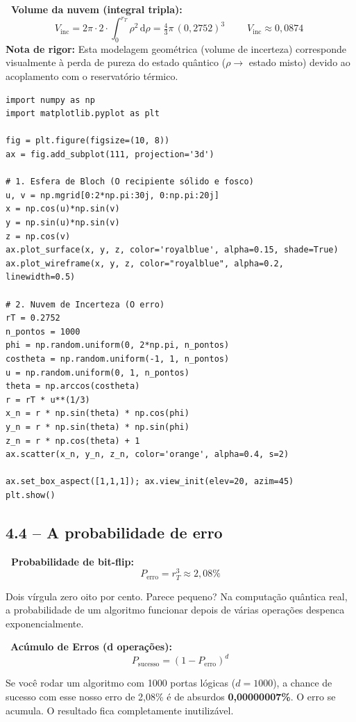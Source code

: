 \begin{mathblock}
\textbf{\color{corMath}\faSuperscript\ Volume da nuvem (integral tripla):}
\[
  V_{\text{inc}}
  = 2\pi \cdot 2 \cdot \int_0^{r_T}\rho^2\,\mathrm{d}\rho
  = \tfrac{4}{3}\pi\,(0{,}2752)^3
  \qquad
  \boxed{\;V_{\text{inc}} \approx 0{,}0874\;}
\]
{\small \textbf{Nota de rigor:} Esta modelagem geométrica (volume de incerteza) 
corresponde visualmente à perda de pureza do estado quântico ($\rho \to$ estado misto) 
devido ao acoplamento com o reservatório térmico.}
\end{mathblock}

\begin{lstlisting}[caption={Código para visualização 3D}]
import numpy as np
import matplotlib.pyplot as plt

fig = plt.figure(figsize=(10, 8))
ax = fig.add_subplot(111, projection='3d')

# 1. Esfera de Bloch (O recipiente sólido e fosco)
u, v = np.mgrid[0:2*np.pi:30j, 0:np.pi:20j]
x = np.cos(u)*np.sin(v)
y = np.sin(u)*np.sin(v)
z = np.cos(v)
ax.plot_surface(x, y, z, color='royalblue', alpha=0.15, shade=True)
ax.plot_wireframe(x, y, z, color="royalblue", alpha=0.2, linewidth=0.5)

# 2. Nuvem de Incerteza (O erro)
rT = 0.2752
n_pontos = 1000
phi = np.random.uniform(0, 2*np.pi, n_pontos)
costheta = np.random.uniform(-1, 1, n_pontos)
u = np.random.uniform(0, 1, n_pontos)
theta = np.arccos(costheta)
r = rT * u**(1/3)
x_n = r * np.sin(theta) * np.cos(phi)
y_n = r * np.sin(theta) * np.sin(phi)
z_n = r * np.cos(theta) + 1 
ax.scatter(x_n, y_n, z_n, color='orange', alpha=0.4, s=2)

ax.set_box_aspect([1,1,1]); ax.view_init(elev=20, azim=45)
plt.show()
\end{lstlisting}

\subsection{4.4 -- A probabilidade de erro}

\begin{mathblock}
\textbf{\color{corMath}\faSuperscript\ Probabilidade de bit-flip:}
\[
  P_{\text{erro}} = r_T^3 \approx 2{,}08\%
\]
\end{mathblock}

\begin{fala}
Dois vírgula zero oito por cento. Parece pequeno? Na computação quântica real, a probabilidade de um algoritmo funcionar depois de várias operações despenca exponencialmente.
\end{fala}

\begin{tela}
\faDesktop\ \textbf{Acúmulo de Erros (d operações):}
\[ P_{\text{sucesso}} = (1 - P_{\text{erro}})^d \]
\end{tela}

\begin{fala}
Se você rodar um algoritmo com 1000 portas lógicas ($d = 1000$), a chance de sucesso com esse nosso erro de 2,08\% é de absurdos \textbf{0,00000007\%}. O erro se acumula. O resultado fica completamente inutilizável.
\end{fala}